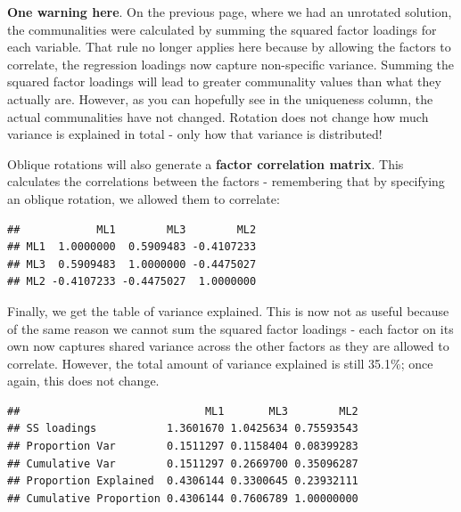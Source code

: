 \documentclass[
]{book}
\newenvironment{Shaded}{\begin{snugshade}}{\end{snugshade}}
\newcommand{\NormalTok}[1]{#1}
\newcommand{\SpecialCharTok}[1]{\textcolor[rgb]{0.81,0.36,0.00}{\textbf{#1}}}
\begin{document}
\textbf{One warning here}. On the previous page, where we had an unrotated solution, the communalities were calculated by summing the squared factor loadings for each variable. That rule no longer applies here because by allowing the factors to correlate, the regression loadings now capture non-specific variance. Summing the squared factor loadings will lead to greater communality values than what they actually are. However, as you can hopefully see in the uniqueness column, the actual communalities have not changed. Rotation does not change how much variance is explained in total - only how that variance is distributed!

Oblique rotations will also generate a \textbf{factor correlation matrix}. This calculates the correlations between the factors - remembering that by specifying an oblique rotation, we allowed them to correlate:

\begin{Shaded}
\end{Shaded}

\begin{verbatim}
##            ML1        ML3        ML2
## ML1  1.0000000  0.5909483 -0.4107233
## ML3  0.5909483  1.0000000 -0.4475027
## ML2 -0.4107233 -0.4475027  1.0000000
\end{verbatim}

Finally, we get the table of variance explained. This is now not as useful because of the same reason we cannot sum the squared factor loadings - each factor on its own now captures shared variance across the other factors as they are allowed to correlate. However, the total amount of variance explained is still 35.1\%; once again, this does not change.

\begin{Shaded}
\end{Shaded}

\begin{verbatim}
##                             ML1       ML3        ML2
## SS loadings           1.3601670 1.0425634 0.75593543
## Proportion Var        0.1511297 0.1158404 0.08399283
## Cumulative Var        0.1511297 0.2669700 0.35096287
## Proportion Explained  0.4306144 0.3300645 0.23932111
## Cumulative Proportion 0.4306144 0.7606789 1.00000000
\end{verbatim}
\end{document}
